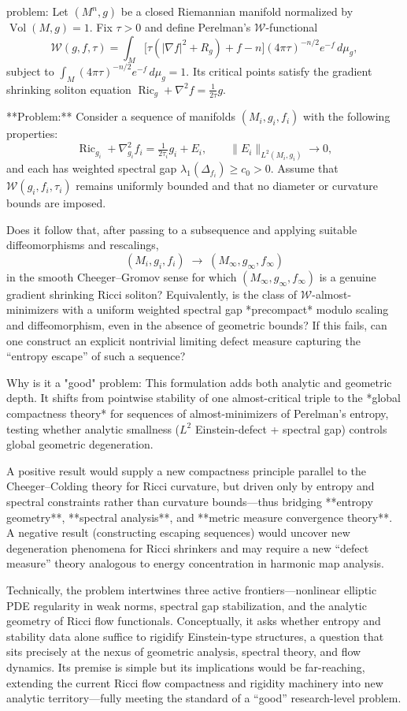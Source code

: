 problem:  
Let \((M^n,g)\) be a closed Riemannian manifold normalized by \(\operatorname{Vol}(M,g)=1\).  
Fix \(\tau>0\) and define Perelman’s \(\mathcal{W}\)-functional
\[
\mathcal{W}(g,f,\tau)=\int_M \big[\tau(|\nabla f|^2+R_g) + f - n\big](4\pi\tau)^{-n/2} e^{-f}\,d\mu_g,
\]
subject to \(\int_M (4\pi\tau)^{-n/2} e^{-f}\,d\mu_g = 1.\)
Its critical points satisfy the gradient shrinking soliton equation
\(\operatorname{Ric}_g + \nabla^2 f = \tfrac1{2\tau}g.\)

**Problem:**  
Consider a sequence of manifolds \((M_i,g_i,f_i)\) with the following properties:
\[
\operatorname{Ric}_{g_i} + \nabla^2_{g_i} f_i = \tfrac{1}{2\tau_i} g_i + E_i,\qquad \|E_i\|_{L^2(M_i,g_i)}\to0,
\]
and each has weighted spectral gap \(\lambda_1(\Delta_{f_i})\ge c_0>0.\)  
Assume that \(\mathcal{W}(g_i,f_i,\tau_i)\) remains uniformly bounded and that no diameter or curvature bounds are imposed.  

Does it follow that, after passing to a subsequence and applying suitable diffeomorphisms and rescalings,  
\[
(M_i,g_i,f_i) \;\longrightarrow\; (M_\infty,g_\infty,f_\infty)
\]
in the smooth Cheeger–Gromov sense for which \((M_\infty,g_\infty,f_\infty)\) is a genuine gradient shrinking Ricci soliton?  
Equivalently, is the class of \(\mathcal{W}\)-almost-minimizers with a uniform weighted spectral gap *precompact* modulo scaling and diffeomorphism, even in the absence of geometric bounds?  
If this fails, can one construct an explicit nontrivial limiting defect measure capturing the “entropy escape” of such a sequence?  

Why is it a "good" problem:  
This formulation adds both analytic and geometric depth. It shifts from pointwise stability of one almost-critical triple to the *global compactness theory* for sequences of almost-minimizers of Perelman's entropy, testing whether analytic smallness (\(L^2\) Einstein-defect + spectral gap) controls global geometric degeneration.  

A positive result would supply a new compactness principle parallel to the Cheeger–Colding theory for Ricci curvature, but driven only by entropy and spectral constraints rather than curvature bounds—thus bridging **entropy geometry**, **spectral analysis**, and **metric measure convergence theory**.  
A negative result (constructing escaping sequences) would uncover new degeneration phenomena for Ricci shrinkers and may require a new “defect measure” theory analogous to energy concentration in harmonic map analysis.  

Technically, the problem intertwines three active frontiers—nonlinear elliptic PDE regularity in weak norms, spectral gap stabilization, and the analytic geometry of Ricci flow functionals. Conceptually, it asks whether entropy and stability data alone suffice to rigidify Einstein-type structures, a question that sits precisely at the nexus of geometric analysis, spectral theory, and flow dynamics.  
Its premise is simple but its implications would be far-reaching, extending the current Ricci flow compactness and rigidity machinery into new analytic territory—fully meeting the standard of a “good” research-level problem.